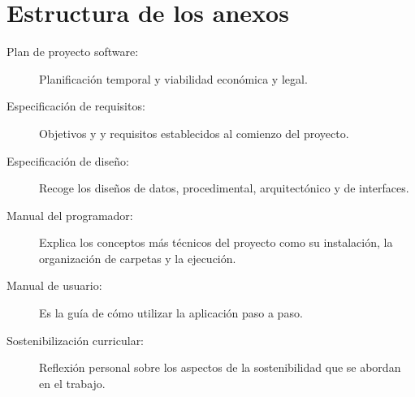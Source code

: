 \section{Estructura de los anexos}
\begin{description}
	\item[Plan de proyecto software:] Planificación temporal y viabilidad económica y legal.
	\item[Especificación de requisitos:] Objetivos y y requisitos establecidos al comienzo del proyecto.    
    \item[Especificación de diseño:] Recoge los diseños de datos, procedimental, arquitectónico y de interfaces.
    \item[Manual del programador:] Explica los conceptos más técnicos del proyecto como su instalación, la organización de carpetas y la ejecución.
    \item[Manual de usuario:] Es la guía de cómo utilizar la aplicación paso a paso.
    \item[Sostenibilización curricular:] Reflexión personal sobre los aspectos de la sostenibilidad que se abordan en el trabajo.
    
\end{description}
